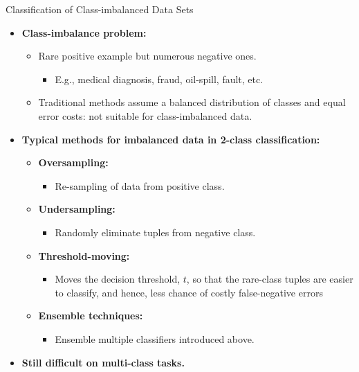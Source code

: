 \begin{frame}{Classification of Class-imbalanced Data Sets}
	\begin{itemize}
		\item \textbf{Class-imbalance problem:}
		      \begin{itemize}
			      \item Rare positive example but numerous negative ones.
			            \begin{itemize}
				            \item E.g., medical diagnosis, fraud, oil-spill, fault, etc.
			            \end{itemize}
			      \item Traditional methods assume a balanced distribution of classes and equal error costs: not suitable for class-imbalanced data.
		      \end{itemize}
		\item \textbf{Typical methods for imbalanced data in 2-class classification:}
		      \begin{itemize}
			      \item \textbf{\color{airforceblue}Oversampling:}
			            \begin{itemize}
				            \item Re-sampling of data from positive class.
			            \end{itemize}
			      \item \textbf{\color{airforceblue}Undersampling:}
			            \begin{itemize}
				            \item Randomly eliminate tuples from negative class.
			            \end{itemize}
			      \item \textbf{\color{airforceblue}Threshold-moving:}
			            \begin{itemize}
				            \item Moves the decision threshold, $t$, so that the rare-class tuples are easier to classify, and hence, less chance of costly false-negative errors
			            \end{itemize}
			      \item \textbf{\color{airforceblue}Ensemble techniques:}
			            \begin{itemize}
				            \item Ensemble multiple classifiers introduced above.
			            \end{itemize}
		      \end{itemize}
		\item \textbf{Still difficult on multi-class tasks.}
	\end{itemize}
\end{frame}
